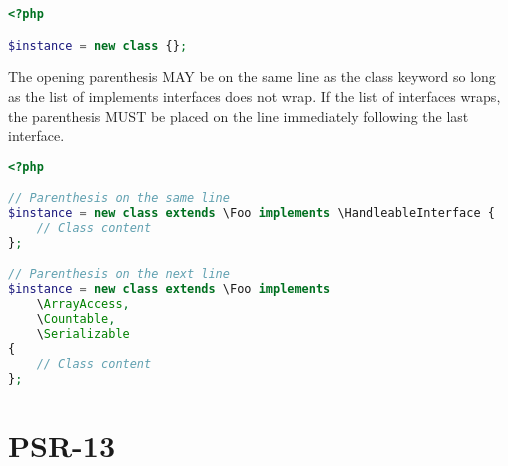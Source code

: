 \begin{lstlisting}[language=PHP]
<?php

$instance = new class {};
\end{lstlisting}

The opening parenthesis MAY be on the same line as the class keyword so long as the list of implements interfaces does not wrap. If the list of interfaces wraps, the parenthesis MUST be placed on the line immediately following the last interface.



\begin{lstlisting}[language=PHP]
<?php

// Parenthesis on the same line
$instance = new class extends \Foo implements \HandleableInterface {
    // Class content
};

// Parenthesis on the next line
$instance = new class extends \Foo implements
    \ArrayAccess,
    \Countable,
    \Serializable
{
    // Class content
};
\end{lstlisting}



\chapter{PSR-13}

\begin{lstlisting}[language=PHP]

\end{lstlisting}




\begin{lstlisting}[language=PHP]

\end{lstlisting}



\begin{lstlisting}[language=PHP]

\end{lstlisting}



\begin{lstlisting}[language=PHP]

\end{lstlisting}